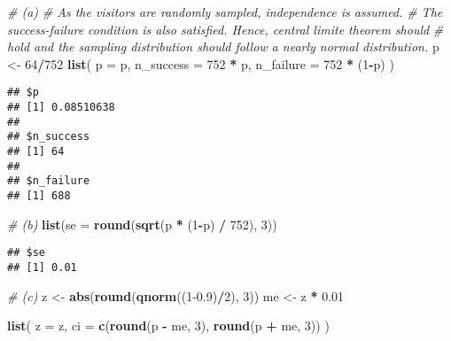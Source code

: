 \documentclass[]{book}
\newenvironment{Shaded}{\begin{snugshade}}{\end{snugshade}}
\newcommand{\CommentTok}[1]{\textcolor[rgb]{0.56,0.35,0.01}{\textit{#1}}}
\newcommand{\DataTypeTok}[1]{\textcolor[rgb]{0.13,0.29,0.53}{#1}}
\newcommand{\DecValTok}[1]{\textcolor[rgb]{0.00,0.00,0.81}{#1}}
\newcommand{\FloatTok}[1]{\textcolor[rgb]{0.00,0.00,0.81}{#1}}
\newcommand{\KeywordTok}[1]{\textcolor[rgb]{0.13,0.29,0.53}{\textbf{#1}}}
\newcommand{\NormalTok}[1]{#1}
\newcommand{\OperatorTok}[1]{\textcolor[rgb]{0.81,0.36,0.00}{\textbf{#1}}}
\newcommand{\StringTok}[1]{\textcolor[rgb]{0.31,0.60,0.02}{#1}}
\begin{document}
\begin{Shaded}
\begin{Highlighting}[]
\CommentTok{# (a) }
\CommentTok{# As the visitors are randomly sampled, independence is assumed. }
\CommentTok{# The success-failure condition is also satisfied. Hence, central limite theorem should}
\CommentTok{# hold and the sampling distribution should follow a nearly normal distribution.}
\NormalTok{p <-}\StringTok{ }\DecValTok{64}\OperatorTok{/}\DecValTok{752}
\KeywordTok{list}\NormalTok{(}
  \DataTypeTok{p =}\NormalTok{ p, }
  \DataTypeTok{n_success =} \DecValTok{752} \OperatorTok{*}\StringTok{ }\NormalTok{p, }
  \DataTypeTok{n_failure =} \DecValTok{752} \OperatorTok{*}\StringTok{ }\NormalTok{(}\DecValTok{1}\OperatorTok{-}\NormalTok{p)}
\NormalTok{)}
\end{Highlighting}
\end{Shaded}

\begin{verbatim}
## $p
## [1] 0.08510638
## 
## $n_success
## [1] 64
## 
## $n_failure
## [1] 688
\end{verbatim}

\begin{Shaded}
\begin{Highlighting}[]
\CommentTok{# (b)}
\KeywordTok{list}\NormalTok{(}\DataTypeTok{se =} \KeywordTok{round}\NormalTok{(}\KeywordTok{sqrt}\NormalTok{(p }\OperatorTok{*}\StringTok{ }\NormalTok{(}\DecValTok{1}\OperatorTok{-}\NormalTok{p) }\OperatorTok{/}\StringTok{ }\DecValTok{752}\NormalTok{), }\DecValTok{3}\NormalTok{))}
\end{Highlighting}
\end{Shaded}

\begin{verbatim}
## $se
## [1] 0.01
\end{verbatim}

\begin{Shaded}
\begin{Highlighting}[]
\CommentTok{# (c)}
\NormalTok{z <-}\StringTok{ }\KeywordTok{abs}\NormalTok{(}\KeywordTok{round}\NormalTok{(}\KeywordTok{qnorm}\NormalTok{((}\DecValTok{1}\FloatTok{-0.9}\NormalTok{)}\OperatorTok{/}\DecValTok{2}\NormalTok{), }\DecValTok{3}\NormalTok{))}
\NormalTok{me <-}\StringTok{ }\NormalTok{z }\OperatorTok{*}\StringTok{ }\FloatTok{0.01}

\KeywordTok{list}\NormalTok{(}
  \DataTypeTok{z =}\NormalTok{ z,}
  \DataTypeTok{ci =} \KeywordTok{c}\NormalTok{(}\KeywordTok{round}\NormalTok{(p }\OperatorTok{-}\StringTok{ }\NormalTok{me, }\DecValTok{3}\NormalTok{), }\KeywordTok{round}\NormalTok{(p }\OperatorTok{+}\StringTok{ }\NormalTok{me, }\DecValTok{3}\NormalTok{))}
\NormalTok{) }
\end{Highlighting}
\end{Shaded}
\end{document}
